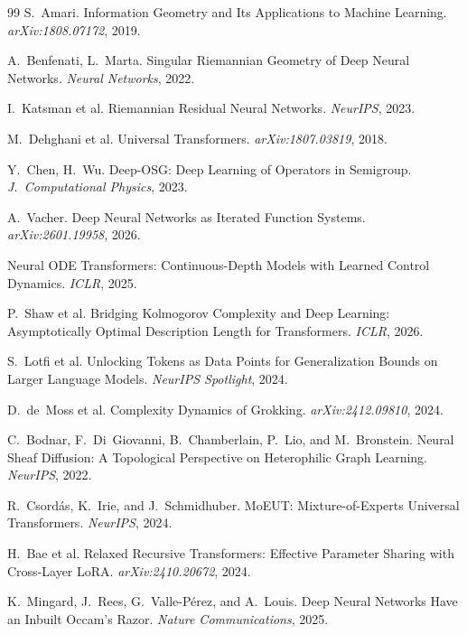 \documentclass[11pt, a4paper]{article}
\theoremstyle{remark}
\begin{document}
\begin{thebibliography}{99}
S.~Amari. Information Geometry and Its Applications to Machine Learning. \emph{arXiv:1808.07172}, 2019.

A.~Benfenati, L.~Marta. Singular Riemannian Geometry of Deep Neural Networks. \emph{Neural Networks}, 2022.

I.~Katsman et al. Riemannian Residual Neural Networks. \emph{NeurIPS}, 2023.

M.~Dehghani et al. Universal Transformers. \emph{arXiv:1807.03819}, 2018.

Y.~Chen, H.~Wu. Deep-OSG: Deep Learning of Operators in Semigroup. \emph{J.\ Computational Physics}, 2023.

A.~Vacher. Deep Neural Networks as Iterated Function Systems. \emph{arXiv:2601.19958}, 2026.

Neural ODE Transformers: Continuous-Depth Models with Learned Control Dynamics. \emph{ICLR}, 2025.

P.~Shaw et al. Bridging Kolmogorov Complexity and Deep Learning: Asymptotically Optimal Description Length for Transformers. \emph{ICLR}, 2026.

S.~Lotfi et al. Unlocking Tokens as Data Points for Generalization Bounds on Larger Language Models. \emph{NeurIPS Spotlight}, 2024.

D.~de~Moss et al. Complexity Dynamics of Grokking. \emph{arXiv:2412.09810}, 2024.

C.~Bodnar, F.~Di~Giovanni, B.~Chamberlain, P.~Lio, and M.~Bronstein.
Neural Sheaf Diffusion: A Topological Perspective on Heterophilic Graph Learning.
\emph{NeurIPS}, 2022.

R.~Csord\'{a}s, K.~Irie, and J.~Schmidhuber.
MoEUT: Mixture-of-Experts Universal Transformers.
\emph{NeurIPS}, 2024.

H.~Bae et al.
Relaxed Recursive Transformers: Effective Parameter Sharing with Cross-Layer LoRA.
\emph{arXiv:2410.20672}, 2024.

K.~Mingard, J.~Rees, G.~Valle-P\'{e}rez, and A.~Louis.
Deep Neural Networks Have an Inbuilt Occam's Razor.
\emph{Nature Communications}, 2025.


\end{thebibliography}
\end{document}

